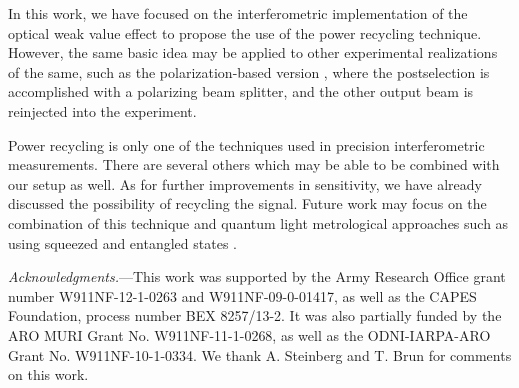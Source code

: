 In this work, we have focused on the interferometric implementation of the optical weak value effect to propose the use of the power recycling technique.  However, the same basic idea may be applied to other experimental realizations of the same, such as the polarization-based version \cite{Hosten2008}, where the postselection is accomplished with a polarizing beam splitter, and the other output beam is reinjected into the experiment.

Power recycling is only one of the techniques used in precision interferometric measurements. There are several others which may be able to be combined with our setup as well.  As for further improvements in sensitivity, we have already discussed the possibility of recycling the signal.  Future work may focus on the combination of this technique and quantum light metrological approaches such as using squeezed and entangled states \cite{Caves1981,Treps2002}.

{\it Acknowledgments.}---This work was supported by the Army Research Office grant number W911NF-12-1-0263 and W911NF-09-0-01417, as well as the CAPES Foundation, process number BEX 8257/13-2. It was also partially funded by the ARO MURI Grant No. W911NF-11-1-0268, as well as the ODNI-IARPA-ARO Grant No. W911NF-10-1-0334. We thank A. Steinberg and T. Brun for comments on this work.

%
%